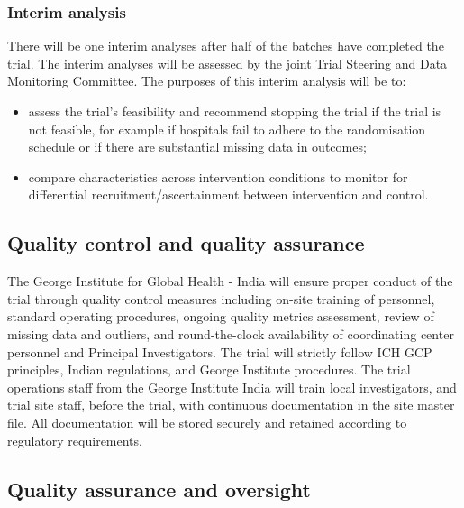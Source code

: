 \documentclass[
]{scrartcl}
\providecommand{\tightlist}{%
  \setlength{\itemsep}{0pt}\setlength{\parskip}{0pt}}\usepackage{longtable,booktabs,array}
\begin{document}
\hypertarget{interim-analysis}{%
\subsubsection{Interim analysis}\label{interim-analysis}}

There will be one interim analyses after half of the batches have
completed the trial. The interim analyses will be assessed by the joint
Trial Steering and Data Monitoring Committee. The purposes of this
interim analysis will be to:

\begin{itemize}
\tightlist
\item
  assess the trial's feasibility and recommend stopping the trial if the
  trial is not feasible, for example if hospitals fail to adhere to the
  randomisation schedule or if there are substantial missing data in
  outcomes;
\item
  compare characteristics across intervention conditions to monitor for
  differential recruitment/ascertainment between intervention and
  control.
\end{itemize}

\hypertarget{quality-control-and-quality-assurance}{%
\subsection{Quality control and quality
assurance}\label{quality-control-and-quality-assurance}}

The George Institute for Global Health - India will ensure proper
conduct of the trial through quality control measures including on-site
training of personnel, standard operating procedures, ongoing quality
metrics assessment, review of missing data and outliers, and
round-the-clock availability of coordinating center personnel and
Principal Investigators. The trial will strictly follow ICH GCP
principles, Indian regulations, and George Institute procedures. The
trial operations staff from the George Institute India will train local
investigators, and trial site staff, before the trial, with continuous
documentation in the site master file. All documentation will be stored
securely and retained according to regulatory requirements.

\hypertarget{quality-assurance-and-oversight}{%
\subsection{Quality assurance and
oversight}\label{quality-assurance-and-oversight}}
\end{document}
